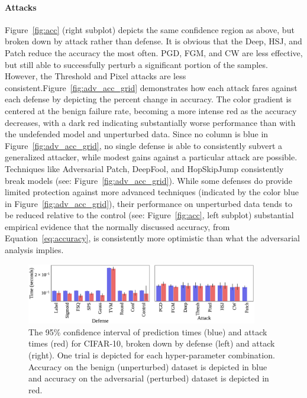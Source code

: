 \documentclass[journal]{IEEEtran}
\begin{document}
\paragraph{Attacks}
    Figure~\ref{fig:acc} (right subplot) depicts the same confidence region as above, but broken down by attack rather than defense. It is obvious that the Deep, HSJ, and Patch reduce the accuracy the most often. PGD, FGM, and CW are less effective, but still able to successfully perturb a significant portion of the samples. However, the Threshold and Pixel attacks are less consistent.Figure~\ref{fig:adv_acc_grid} demonstrates how each attack fares against each defense by depicting the percent change in accuracy. The color gradient is centered at the benign failure rate, becoming a more intense red as the accuracy decreases, with a dark red indicating substantially worse performance than with the undefended model and unperturbed data. Since no column is blue in Figure~\ref{fig:adv_acc_grid}, no single defense is able to consistently subvert a generalized attacker, while modest gains against a particular attack are possible. Techniques like Adversarial Patch, DeepFool, and HopSkipJump consistently break models (see: Figure~\ref{fig:adv_acc_grid}). While some defenses do provide limited protection against more advanced techniques (indicated by the color blue in Figure~\ref{fig:adv_acc_grid}), their performance on unperturbed data tends to be reduced relative to the control (see: Figure~\ref{fig:acc}, left subplot) substantial empirical evidence that the normally discussed accuracy, from Equation~\ref{eq:accuracy}, is consistently more optimistic than what the adversarial analysis implies.

\begin{figure}[!hptb]
    {\centering
    \includegraphics[trim={0 0.85em 0 0.35em},clip,width=0.9\textwidth]{Fig13.eps}
    \vspace{-1em}
    \caption{The 95\% confidence interval of prediction times (blue) and attack times (red) for CIFAR-10, broken down by defense (left) and attack (right). One trial is depicted for each hyper-parameter combination. Accuracy on the benign (unperturbed) dataset is depicted in blue and accuracy on the adversarial (perturbed) dataset is depicted in red.}
    \label{fig:time}
    } %
\end{figure}
\end{document}
